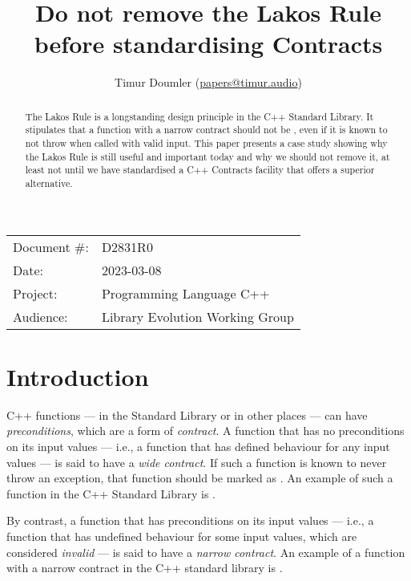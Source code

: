 


\title{Do not remove the Lakos Rule before standardising Contracts}
\author{ Timur Doumler \small(\href{mailto:papers@timur.audio}{papers@timur.audio})  }
\date{}
\maketitle

\begin{tabular}{ll}
Document \#: & D2831R0 \\
Date: &2023-03-08 \\
Project: & Programming Language C++ \\
Audience: & Library Evolution Working Group
\end{tabular}

\begin{abstract}
The Lakos Rule is a longstanding design principle in the C++ Standard Library. It stipulates that a function with a narrow contract should not be , even if it is known to not throw when called with valid input. This paper presents a case study showing why the Lakos Rule is still useful and important today and why we should not remove it, at least not until we have standardised a C++ Contracts facility that offers a superior alternative.
\end{abstract}

\section{Introduction}
\label{sec:intro}

C++ functions --- in the Standard Library or in other places --- can have \emph{preconditions}, which are a form of \emph{contract}. A function that has no preconditions on its input values --- i.e., a function that has defined behaviour for any input values --- is said to have a \emph{wide contract}.  If such a function is known to never throw an exception, that function should be marked as . An example of such a function in the C++ Standard Library is .

By contrast, a function that has preconditions on its input values --- i.e., a function that has undefined behaviour for some input values, which are considered \emph{invalid} --- is said to have a \emph{narrow contract}. An example of a function with a narrow contract in the C++ standard library is .

